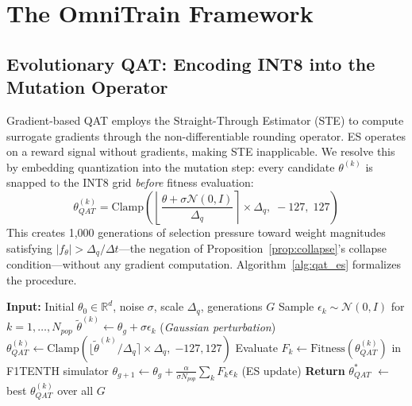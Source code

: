\documentclass[lettersize,journal]{IEEEtran}
\begin{document}
\section{The OmniTrain Framework}

\subsection{Evolutionary QAT: Encoding INT8 into the Mutation Operator}
Gradient-based QAT employs the Straight-Through Estimator (STE) to compute surrogate gradients through the non-differentiable rounding operator. ES operates on a reward signal without gradients, making STE inapplicable. We resolve this by embedding quantization into the mutation step: every candidate $\theta^{(k)}$ is snapped to the INT8 grid \textit{before} fitness evaluation:
\begin{equation}
\theta^{(k)}_{QAT} = \text{Clamp}\!\left(\!\left\lfloor\frac{\theta + \sigma\mathcal{N}(0,I)}{\Delta_q}\right\rceil\!\times\Delta_q,\; -127,\; 127\right)
\label{eq:mutation}
\end{equation}
This creates 1,000 generations of selection pressure toward weight magnitudes satisfying $|f_\theta| > \Delta_q/\Delta t$---the negation of Proposition~\ref{prop:collapse}'s collapse condition---without any gradient computation. Algorithm~\ref{alg:qat_es} formalizes the procedure.

\begin{algorithm}[!t]
\caption{QAT-ES for SparseCfC Training}
\label{alg:qat_es}
\begin{algorithmic}
\STATE \textbf{Input:} Initial $\theta_0 \in \mathbb{R}^d$, noise $\sigma$, scale $\Delta_q$, generations $G$
    \STATE Sample $\epsilon_k \sim \mathcal{N}(0, I)$ for $k = 1,\ldots, N_{pop}$
    \STATE $\tilde{\theta}^{(k)} \leftarrow \theta_g + \sigma\epsilon_k$ \quad (\textit{Gaussian perturbation})
    \STATE $\theta^{(k)}_{QAT} \leftarrow \text{Clamp}(\lfloor\tilde{\theta}^{(k)}/\Delta_q\rceil\!\times\!\Delta_q,\;{-127},{127})$
    \STATE Evaluate $F_k \leftarrow \text{Fitness}(\theta^{(k)}_{QAT})$ in F1TENTH simulator
    \STATE $\theta_{g+1} \leftarrow \theta_g + \frac{\alpha}{\sigma N_{pop}}\sum_k F_k \epsilon_k$ \quad (ES update)
\ENDFOR
\STATE \textbf{Return} $\theta^*_{QAT}$ $\leftarrow$ best $\theta^{(k)}_{QAT}$ over all $G$
\end{algorithmic}
\end{algorithm}
\end{document}
